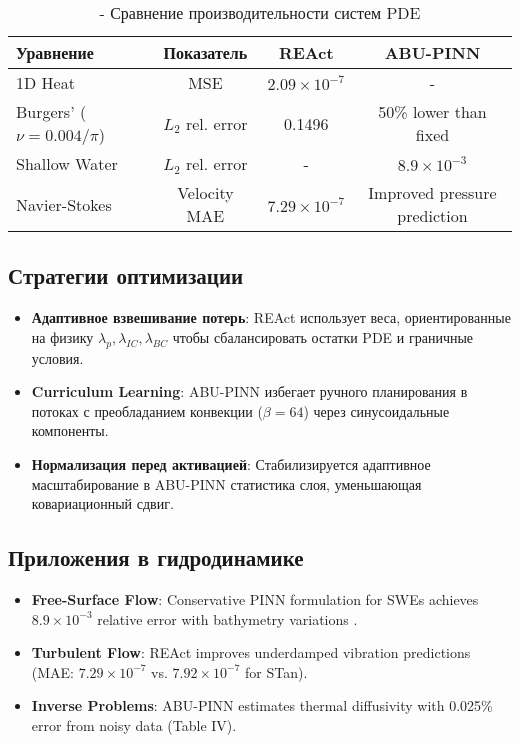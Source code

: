\begin{table}[h]
\centering
\caption{- Сравнение производительности систем PDE}
\begin{tabular}{l|c|c|c}
\textbf{Уравнение} & \textbf{Показатель} & \textbf{REAct} & \textbf{ABU-PINN} \\
\hline
1D Heat & MSE & $2.09 \times 10^{-7}$ & - \\
Burgers' ($\nu=0.004/\pi$) & $L_2$ rel. error & 0.1496 & 50\% lower than fixed \\
Shallow Water & $L_2$ rel. error & - & $8.9 \times 10^{-3}$ \\
Navier-Stokes & Velocity MAE & $7.29 \times 10^{-7}$ & Improved pressure prediction \\
\end{tabular}
\end{table}

\subsection{Стратегии оптимизации}
\begin{itemize}
    \item \textbf{Адаптивное взвешивание потерь}:  REAct использует веса, ориентированные на физику $\lambda_p, \lambda_{IC}, \lambda_{BC}$ чтобы сбалансировать остатки PDE и граничные условия.
    \item \textbf{Curriculum Learning}: ABU-PINN избегает ручного планирования в потоках с преобладанием конвекции ($\beta=64$) через синусоидальные компоненты.
    \item \textbf{Нормализация перед активацией}: Стабилизируется адаптивное масштабирование в ABU-PINN статистика слоя, уменьшающая ковариационный сдвиг.
\end{itemize}

\subsection{Приложения в гидродинамике}
\begin{itemize}
    \item \textbf{Free-Surface Flow}: Conservative PINN formulation for SWEs achieves $8.9 \times 10^{-3}$ relative error with bathymetry variations \cite{shallow_water}.
    \item \textbf{Turbulent Flow}: REAct improves underdamped vibration predictions (MAE: $7.29 \times 10^{-7}$ vs. $7.92 \times 10^{-7}$ for STan).
    \item \textbf{Inverse Problems}: ABU-PINN estimates thermal diffusivity with 0.025\% error from noisy data (Table IV).
\end{itemize}

